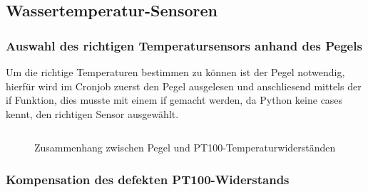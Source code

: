 \subsection{Wassertemperatur-Sensoren}
\newline
{}\newline
{}\newline
{}\newline


\subsubsection*{Auswahl des richtigen Temperatursensors anhand des Pegels}
\newline
{}\newline
Um die richtige Temperaturen bestimmen zu können ist der Pegel notwendig, hierfür wird im Cronjob zuerst den Pegel ausgelesen und anschliesend mittels der if Funktion, dies musste mit einem if gemacht werden, da Python keine cases kennt, den richtigen Sensor ausgewählt.

\begin{lstlisting}

\end{lstlisting}

\begin{figure}[h]
	\centering
	\caption{Zusammenhang zwischen Pegel und PT100-Temperaturwiderständen}
	\label{img:wassertempsensoren}
\end{figure}


\subsubsection*{Kompensation des defekten PT100-Widerstands}
\newline
{}\newline
{}\newline

